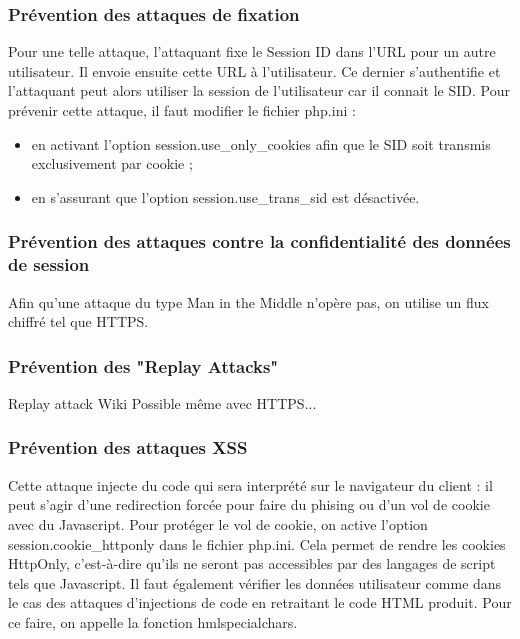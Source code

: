 \documentclass[a4paper]{article}
\begin{document}
		\subsubsection{Prévention des attaques de fixation}
		
Pour une telle attaque, l'attaquant fixe le Session ID dans l'URL pour un autre utilisateur.
Il envoie ensuite cette URL à l'utilisateur. Ce dernier s'authentifie et l'attaquant peut alors
utiliser la session de l'utilisateur car il connait le SID.
Pour prévenir cette attaque, il faut modifier le fichier php.ini :
\begin{itemize}
	\item en activant l'option session.use\_only\_cookies afin que le SID soit transmis exclusivement par cookie ;
	\item en s'assurant que l'option session.use\_trans\_sid est désactivée.
\end{itemize}
	
		\subsubsection{Prévention des attaques contre la confidentialité des données de session}
		
Afin qu'une attaque du type Man in the Middle n'opère pas, on utilise un flux chiffré tel que HTTPS.

		\subsubsection{Prévention des "Replay Attacks"}

		Replay attack Wiki
		Possible même avec HTTPS...
 		
 		\subsubsection{Prévention des attaques XSS}
 		
Cette attaque injecte du code qui sera interprété sur le navigateur du client : il peut s'agir d'une redirection forcée pour faire 
du phising ou d'un vol de cookie avec du Javascript.
Pour protéger le vol de cookie, on active l'option session.cookie\_httponly dans le fichier php.ini.
Cela permet de rendre les cookies HttpOnly, c'est-à-dire qu'ils ne seront pas accessibles par des langages de script tels que Javascript.
Il faut également vérifier les données utilisateur comme dans le cas des attaques d'injections de code en retraitant le code
HTML produit. Pour ce faire, on appelle la fonction hmlspecialchars.
 		
\end{document}
